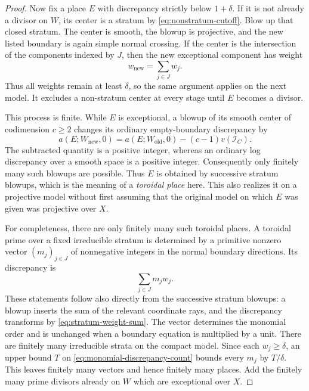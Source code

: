 \begin{proof}
Now fix a place $E$ with discrepancy strictly below $1+\delta$.
If it is not already a divisor on $W$, its center is a stratum by
\eqref{eq:nonstratum-cutoff}.  Blow up that closed stratum.
The center is smooth, the blowup is projective, and the new listed
boundary is again simple normal crossing.  If the center is the
intersection of the components indexed by $J$, then the new exceptional
component has weight
\begin{equation}\label{eq:stratum-weight-sum}
 w_{\mathrm{new}}=\sum_{j\in J}w_j.
\end{equation}
Thus all weights remain at least $\delta$, so the same argument
applies on the next model.  It excludes a non-stratum center at
every stage until $E$ becomes a divisor.

This process is finite.  While $E$ is exceptional, a blowup of its
smooth center of codimension $c\geq2$ changes its ordinary
empty-boundary discrepancy by
\[
 a(E;W_{\mathrm{new}},0)
 =a(E;W_{\mathrm{old}},0)-(c-1)v(\mathcal I_C).
\]
The subtracted quantity is a positive integer, whereas an ordinary
log discrepancy over a smooth space is a positive integer.
Consequently only finitely many such blowups are possible.
Thus $E$ is obtained by successive stratum blowups, which is the
meaning of a \emph{toroidal place} here.  This also realizes it on a projective model without first assuming
that the original model on which $E$ was given was projective over $X$.

For completeness, there are only finitely many such toroidal places.
A toroidal prime over a fixed irreducible stratum is determined by a
primitive nonzero vector $(m_j)_{j\in J}$ of nonnegative integers
in the normal boundary directions.  Its discrepancy is
\begin{equation}\label{eq:monomial-discrepancy-count}
 \sum_{j\in J}m_jw_j.
\end{equation}
These statements follow also directly from the successive stratum
blowups: a blowup inserts the sum of the relevant coordinate rays,
and the discrepancy transforms by \eqref{eq:stratum-weight-sum}.
The vector determines the monomial order and is unchanged when a
boundary equation is multiplied by a unit.  There are finitely many
irreducible strata on the compact model.  Since each $w_j\geq\delta$,
an upper bound $T$ on \eqref{eq:monomial-discrepancy-count} bounds
every $m_j$ by $T/\delta$.  This leaves finitely many vectors and
hence finitely many places.  Add the finitely many prime divisors
already on $W$ which are exceptional over $X$.


\end{proof}
